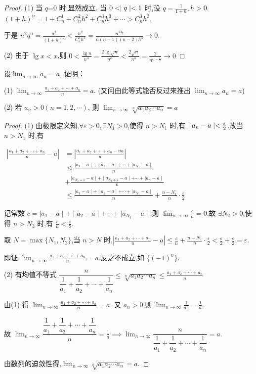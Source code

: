 \begin{proof}
    (1) 当 $q$=0 时,显然成立. 当 $0<\mid q \mid<1$ 时,设 $q=\frac{1}{1+h},h>0$. $(1+h)^n=1+C_n^1+C_n^2h^2+C_n^3h^3+\cdots>C_n^3h^3$. 
    
    于是 $n^2q^n=\frac{n^2}{(1+h)^2}<\frac{n^2}{C_n^3h^3}=\frac{n^23!}{n(n-1)(n-2)h^3}\to 0$.

    (2) 由于 $\lg x<x$,则 $0<\frac{\lg n}{n^{\alpha}}=\frac{2\lg \sqrt{n}}{n^{\alpha}}<\frac{2\sqrt{n}}{n^{\alpha}}=\frac{2}{n^{\alpha-\frac{1}{2}}}\to 0$
\end{proof}

\begin{practice}
设$\lim_{n\to\infty} a_n=a$,
证明：

(1) $\lim_{n\to\infty}\frac{a_1+a_2+\cdots+a_n}n=a$. 
(又问由此等式能否反过来推出 $\lim_{n\to\infty} a_n=a$)

(2) 若 $a_n>0(n=1,2,\cdots)$, 则 $\lim_{n\to\infty}\sqrt[n]{a_1a_2\cdots a_n}=a$
\end{practice}

\begin{proof}
    (1) 由极限定义知,$\forall \varepsilon>0,\exists N_1>0 $,使得 $ n>N_1$ 时,有 $\mid a_n-a \mid<\frac{\varepsilon}{2}$.故当 $n>N_1$ 时,有 
    
    $\begin{aligned}
        \left|\frac{a_{1}+a_{2}+\cdots+a_{n}}{n}-a\right|& =\left|\frac{a_1+a_2+\cdots+a_n-na}n\right|  \\
        &\leqslant\frac{\mid a_1-a\mid+\mid a_2-a\mid+\cdots+\mid a_{N_1}-a\mid}n \\
        &+\frac{\mid a_{N_1+1}-a\mid+\mid a_{N_1+2}-a\mid+\cdots+\mid a_n-a\mid}n \\
        &\leqslant\frac{\mid a_1-a\mid+\mid a_2-a\mid+\cdots+\mid a_{N_1}-a\mid}n+\frac{n-N_1}n\cdot\frac\varepsilon2
    \end{aligned}$ 

    记常数 $c=\mid a_1-a\mid+\mid a_2-a\mid+\cdots+\mid a_{N_1}-a\mid $,则 $\lim_{n\to\infty} \frac{c}{n}=0$.故 $\exists N_2>0$,使得 $ n>N_2$ 时,有 $\frac{c}{n}<\frac{\varepsilon}{2}$. 
    
    取 $N=\max\{N_1,N_2\}$,当 $n>N$ 时,$\left|\frac{a_1+a_2+\cdots+a_n}{n}-a\right|\leqslant\frac{c}{n}+\frac{n-N_1}{n}\cdot\frac{\varepsilon}{2}<\frac{\varepsilon}{2}+\frac{\varepsilon}{2}=\varepsilon $.

    即证 $\lim_{n\to\infty}\frac{a_1+a_2+\cdots+a_n}n=a$.反之不成立,如 $\{(-1)^n\}$.

    (2) 有均值不等式 $\dfrac{n}{\dfrac{1}{a_1}+\dfrac{1}{a_2}+\cdots+\dfrac{1}{a_n}}\leqslant\sqrt[n]{a_1a_2\cdots a_n}\leqslant\frac{a_1+a_2+\cdots+a_n}n$

    由(1) 得 $\lim_{n\to\infty}\frac{a_1+a_2+\cdots+a_n}n=a$. 又 $a_n>0$,则 $\lim_{n\to\infty} \frac{1}{a_n}=\frac{1}{a}$.
    
    故 $\lim_{n\to\infty} \dfrac{\dfrac{1}{a_1}+\dfrac{1}{a_2}+\cdots+\dfrac{1}{a_n}}{n}=\frac{1}{a}
    \implies \lim_{n\to\infty} \dfrac{n}{\dfrac{1}{a_1}+\dfrac{1}{a_2}+\cdots+\dfrac{1}{a_n}}=a$.

    由数列的迫敛性得,$\lim_{n\to\infty}\sqrt[n]{a_1a_2\cdots a_n}=a$.
\end{proof}

